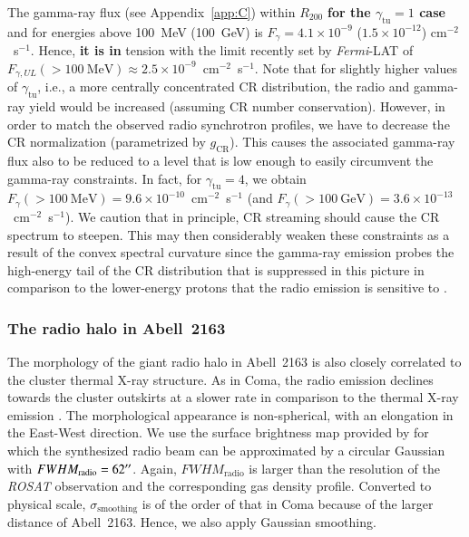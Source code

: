 \documentclass[traditabstract]{aa}
\def\C#1{{\bf #1}}
\newcommand{\rmn}{\mathrm}
\begin{document}
The gamma-ray flux (see Appendix~\ref{app:C}) within $R_{200}$ \C{for the 
$\gamma_{\rmn{tu}} = 1$ case} and for energies above 100~MeV (100~GeV) 
is $F_{\gamma} = 4.1 \times 10^{-9}$ ($1.5 \times 10^{-12}$) cm$^{-2}$~s$^{-1}$. 
Hence, \C{it is in} tension with the limit recently set by
\emph{Fermi}-LAT \citep{2012AAS...21920701Z} of $F_{\gamma, UL} (>100~\rmn{MeV})
\approx 2.5 \times 10^{-9}$~cm$^{-2}$~s$^{-1}$.  Note that for slightly higher
values of $\gamma_{\rmn{tu}}$, i.e., a more centrally concentrated CR
distribution, the radio and gamma-ray yield would be increased (assuming CR
number conservation). However, in order to match the observed radio synchrotron
profiles, we have to decrease the CR normalization (parametrized by
$g_{\rmn{CR}}$). This causes the associated gamma-ray flux also to be reduced to
a level that is low enough to easily circumvent the gamma-ray constraints. In
fact, for $\gamma_{\rmn{tu}} = 4$, we obtain $F_{\gamma} (>100~\rmn{MeV}) = 9.6
\times 10^{-10}$~cm$^{-2}$~s$^{-1}$ (and $F_{\gamma} (>100~\rmn{GeV}) = 3.6
\times 10^{-13}$~cm$^{-2}$~s$^{-1}$). We caution that in principle, CR streaming
should cause the CR spectrum to steepen. This may then considerably weaken these
constraints as a result of the convex spectral curvature since the gamma-ray
emission probes the high-energy tail of the CR distribution that is suppressed
in this picture in comparison to the lower-energy protons that the radio
emission is sensitive to \citep[see][for an extended discussion of this
point]{2011arXiv1111.5544M}.


\subsubsection{The radio halo in Abell~2163}

The morphology of the giant radio halo in Abell~2163 is also closely correlated
to the cluster thermal X-ray structure. As in Coma, the radio emission declines
towards the cluster outskirts at a slower rate in comparison to the thermal
X-ray emission \citep{2001A&A...373..106F}. The morphological appearance is
non-spherical, with an elongation in the East-West direction. We use the surface
brightness map provided by \citet{2009A&A...499..679M} for which the synthesized
radio beam can be approximated by a circular Gaussian with
$FWHM_{\rmn{radio}}=62\arcsec$.  Again, $FWHM_{\rmn{radio}}$ is larger than the
resolution of the \emph{ROSAT} observation and the corresponding gas density
profile. Converted to physical scale, $\sigma_{\rmn{smoothing}}$ is of the order
of that in Coma because of the larger distance of Abell~2163. Hence, we also apply
Gaussian smoothing.
\end{document}
